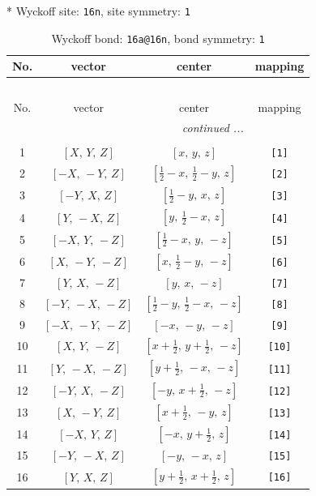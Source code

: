 \documentclass[fleqn,8pt]{jsarticle}
\begin{document}
* Wyckoff site: {\tt 16n}, site symmetry: {\tt 1}
\renewcommand{\arraystretch}{1.2}
\begin{longtable}{cccc}
\caption{Wyckoff bond: {\tt 16a@16n}, bond symmetry: {\tt 1}}
 \\
 \hline \hline
No. & vector & center & mapping \\ \hline \endfirsthead

\multicolumn{3}{l}{\tablename\ \thetable{}} \\
 \hline \hline
No. & vector & center & mapping \\ \hline \endhead

 \hline \hline
\multicolumn{3}{r}{\footnotesize\it continued ...} \\ \endfoot

 \hline \hline
\multicolumn{3}{r}{} \\ \endlastfoot

1 & $\left[ X,\, Y,\, Z \right]$ & $\left[ x,\, y,\, z \right]$ & {\tt [1]} \\ \hline
2 & $\left[ - X,\, - Y,\, Z \right]$ & $\left[ \frac{1}{2} - x,\, \frac{1}{2} - y,\, z \right]$ & {\tt [2]} \\ \hline
3 & $\left[ - Y,\, X,\, Z \right]$ & $\left[ \frac{1}{2} - y,\, x,\, z \right]$ & {\tt [3]} \\ \hline
4 & $\left[ Y,\, - X,\, Z \right]$ & $\left[ y,\, \frac{1}{2} - x,\, z \right]$ & {\tt [4]} \\ \hline
5 & $\left[ - X,\, Y,\, - Z \right]$ & $\left[ \frac{1}{2} - x,\, y,\, - z \right]$ & {\tt [5]} \\ \hline
6 & $\left[ X,\, - Y,\, - Z \right]$ & $\left[ x,\, \frac{1}{2} - y,\, - z \right]$ & {\tt [6]} \\ \hline
7 & $\left[ Y,\, X,\, - Z \right]$ & $\left[ y,\, x,\, - z \right]$ & {\tt [7]} \\ \hline
8 & $\left[ - Y,\, - X,\, - Z \right]$ & $\left[ \frac{1}{2} - y,\, \frac{1}{2} - x,\, - z \right]$ & {\tt [8]} \\ \hline
9 & $\left[ - X,\, - Y,\, - Z \right]$ & $\left[ - x,\, - y,\, - z \right]$ & {\tt [9]} \\ \hline
10 & $\left[ X,\, Y,\, - Z \right]$ & $\left[ x + \frac{1}{2},\, y + \frac{1}{2},\, - z \right]$ & {\tt [10]} \\ \hline
11 & $\left[ Y,\, - X,\, - Z \right]$ & $\left[ y + \frac{1}{2},\, - x,\, - z \right]$ & {\tt [11]} \\ \hline
12 & $\left[ - Y,\, X,\, - Z \right]$ & $\left[ - y,\, x + \frac{1}{2},\, - z \right]$ & {\tt [12]} \\ \hline
13 & $\left[ X,\, - Y,\, Z \right]$ & $\left[ x + \frac{1}{2},\, - y,\, z \right]$ & {\tt [13]} \\ \hline
14 & $\left[ - X,\, Y,\, Z \right]$ & $\left[ - x,\, y + \frac{1}{2},\, z \right]$ & {\tt [14]} \\ \hline
15 & $\left[ - Y,\, - X,\, Z \right]$ & $\left[ - y,\, - x,\, z \right]$ & {\tt [15]} \\ \hline
16 & $\left[ Y,\, X,\, Z \right]$ & $\left[ y + \frac{1}{2},\, x + \frac{1}{2},\, z \right]$ & {\tt [16]} \\
\end{longtable}
\end{document}
